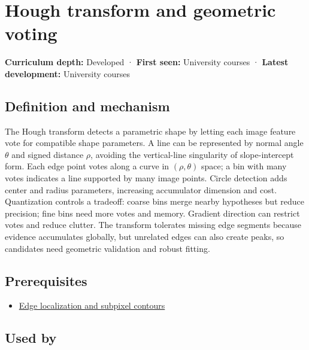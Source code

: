 \hypertarget{appendix-a5b0383b3b3e}{}\label{referencestart:appendix-a5b0383b3b3e}
\section{Hough transform and geometric voting}\label{appendix-a5b0383b3b3e-hough-transform-and-geometric-voting}

\textbf{Curriculum depth:} Developed · \textbf{First seen:} University courses · \textbf{Latest development:} University courses

\begin{allmightroledefinition}

\subsection{Definition and mechanism}\label{appendix-a5b0383b3b3e-definition-and-mechanism}

The Hough transform detects a parametric shape by letting each image feature vote for compatible shape parameters. A line can be represented by normal angle \(\theta\) and signed distance \(\rho\), avoiding the vertical-line singularity of slope-intercept form. Each edge point votes along a curve in \((\rho,\theta)\) space; a bin with many votes indicates a line supported by many image points. Circle detection adds center and radius parameters, increasing accumulator dimension and cost. Quantization controls a tradeoff: coarse bins merge nearby hypotheses but reduce precision; fine bins need more votes and memory. Gradient direction can restrict votes and reduce clutter. The transform tolerates missing edge segments because evidence accumulates globally, but unrelated edges can also create peaks, so candidates need geometric validation and robust fitting.

\end{allmightroledefinition}

\subsection{Prerequisites}\label{appendix-a5b0383b3b3e-prerequisites}

\begin{itemize}
\tightlist
\item
  \hyperref[appendix-36022286b03e]{Edge localization and subpixel contours}
\end{itemize}

\subsection{Used by}\label{appendix-a5b0383b3b3e-used-by}

